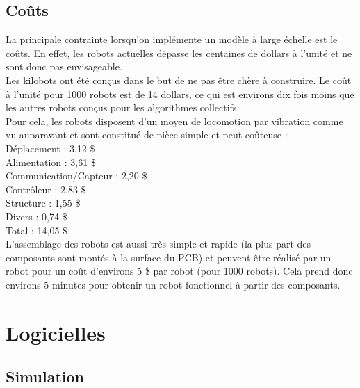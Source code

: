 \documentclass[a4paper,8pt]{report}
\begin{document}
\subsection*{Co\^uts}\label{subsec:name}

La principale contrainte lorsqu'on impl\'emente un mod\`ele \`a large \'echelle est le co\^uts. En effet, les robots actuelles d\'epasse les centaines de dollars \`a l'unit\'e et ne sont donc pas envisageable. \\
Les kilobots ont \'et\'e conçus dans le but de ne pas \^etre ch\`ere \`a construire. Le co\^ut \`a l'unit\'e pour 1000 robots est de 14 dollars, ce qui est environs dix fois moins que les autres robots conçus pour les algorithmes collectifs. \\
Pour cela, les robots disposent d'un moyen de locomotion par vibration comme vu auparavant et sont constitu\'e de pi\`ece simple et peut co\^uteuse : \\

\noindent D\'eplacement : 3,12 \$ \\
Alimentation : 3,61 \$ \\
Communication/Capteur : 2,20 \$ \\
Contr\^oleur : 2,83 \$ \\
Structure : 1,55 \$ \\
Divers : 0,74 \$ \\
Total : 14,05 \$ \\

L'assemblage des robots est aussi tr\`es simple et rapide (la plus part des composants sont mont\'es \`a la  surface du PCB) et peuvent \^etre r\'ealis\'e par un robot pour un co\^ut d'environs 5 \$ par robot (pour 1000 robots). Cela prend donc environs 5 minutes pour obtenir un robot fonctionnel \`a partir des composants.

\section*{Logicielles}\label{sec:name}

\subsection*{Simulation}\label{subsec:name}
\end{document}
